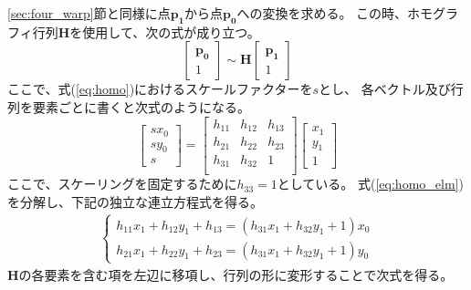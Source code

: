 \ref{sec:four_warp}節と同様に点$\bm{p_1}$から点$\bm{p_0}$への変換を求める。
この時、ホモグラフィ行列$\bm{H}$を使用して、次の式が成り立つ。
\begin{equation}\label{eq:homo}
    \begin{bmatrix} 
        \bm{p_0} \\
        1
    \end{bmatrix}    
    \sim \bm{H}     
    \begin{bmatrix} 
        \bm{p_1} \\
        1
    \end{bmatrix}  
\end{equation}
ここで、式(\ref{eq:homo})におけるスケールファクターを$s$とし、
各ベクトル及び行列を要素ごとに書くと次式のようになる。
\begin{equation}\label{eq:homo_elm}
    \begin{bmatrix} 
        s x_0 \\ 
        s y_0 \\
        s
    \end{bmatrix} 
    =
    \begin{bmatrix}
        h_{11} & h_{12} & h_{13} \\
        h_{21} & h_{22} & h_{23} \\
        h_{31} & h_{32} & 1 \\
    \end{bmatrix}
    \begin{bmatrix}
        x_1 \\ 
        y_1 \\
        1
    \end{bmatrix}
\end{equation}
ここで、スケーリングを固定するために$h_{33}=1$としている。
式(\ref{eq:homo_elm})を分解し、下記の独立な連立方程式を得る。
\begin{eqnarray}
    \left\{
      \begin{array}{l}
        h_{11} x_1 + h_{12} y_1 + h_13 = (h_{31} x_1 + h_{32} y_1 + 1) x_0 \\
        h_{21} x_1 + h_{22} y_1 + h_23 = (h_{31} x_1 + h_{32} y_1 + 1) y_0
      \end{array}
    \right.
\end{eqnarray}
$\bm{H}$の各要素を含む項を左辺に移項し、行列の形に変形することで次式を得る。
